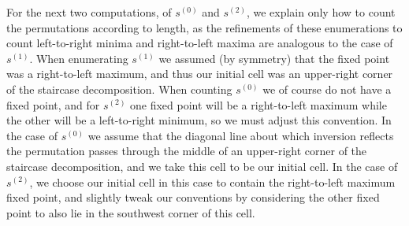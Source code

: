 \documentclass[10pt]{article}
\theoremstyle{plain}
\begin{document}
For the next two computations, of $s^{(0)}$ and $s^{(2)}$, we explain only how to count the permutations according to length, as the refinements of these enumerations to count left-to-right minima and right-to-left maxima are analogous to the case of $s^{(1)}$. When enumerating $s^{(1)}$ we assumed (by symmetry) that the fixed point was a right-to-left maximum, and thus our initial cell was an upper-right corner of the staircase decomposition. When counting $s^{(0)}$ we of course do not have a fixed point, and for $s^{(2)}$ one fixed point will be a right-to-left maximum while the other will be a left-to-right minimum, so we must adjust this convention. In the case of $s^{(0)}$ we assume that the diagonal line about which inversion reflects the permutation passes through the middle of an upper-right corner of the staircase decomposition, and we take this cell to be our initial cell. In the case of $s^{(2)}$, we choose our initial cell in this case to contain the right-to-left maximum fixed point, and slightly tweak our conventions by considering the other fixed point to also lie in the southwest corner of this cell.
\end{document}
